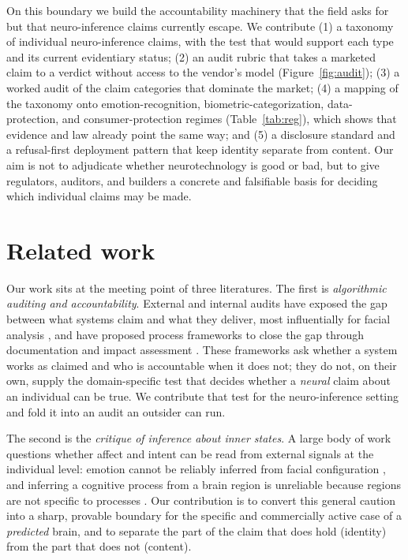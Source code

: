 \documentclass[sigconf,review,anonymous]{acmart}
\begin{document}
On this boundary we build the accountability machinery that the field asks for but that neuro-inference
claims currently escape. We contribute (1) a taxonomy of individual neuro-inference claims, with the test
that would support each type and its current evidentiary status; (2) an audit rubric that takes a marketed
claim to a verdict without access to the vendor's model (Figure~\ref{fig:audit}); (3) a worked audit of the
claim categories that dominate the market; (4) a mapping of the taxonomy onto emotion-recognition,
biometric-categorization, data-protection, and consumer-protection regimes (Table~\ref{tab:reg}), which shows
that evidence and law already point the same way; and (5) a disclosure standard and a refusal-first
deployment pattern that keep identity separate from content. Our aim is not to adjudicate whether
neurotechnology is good or bad, but to give regulators, auditors, and builders a concrete and falsifiable
basis for deciding which individual claims may be made.

\section{Related work}
Our work sits at the meeting point of three literatures. The first is \emph{algorithmic auditing and
accountability}. External and internal audits have exposed the gap between what systems claim and what they
deliver, most influentially for facial analysis \cite{buolamwini2018}, and have proposed process frameworks
to close the gap through documentation and impact assessment \cite{raji2020,metcalf2021}. These frameworks
ask whether a system works as claimed and who is accountable when it does not; they do not, on their own,
supply the domain-specific test that decides whether a \emph{neural} claim about an individual can be true.
We contribute that test for the neuro-inference setting and fold it into an audit an outsider can run.

The second is the \emph{critique of inference about inner states}. A large body of work questions whether
affect and intent can be read from external signals at the individual level: emotion cannot be reliably
inferred from facial configuration \cite{barrett2019}, and inferring a cognitive process from a brain region
is unreliable because regions are not specific to processes \cite{poldrack2006,hutzler2013}. Our
contribution is to convert this general caution into a sharp, provable boundary for the specific and
commercially active case of a \emph{predicted} brain, and to separate the part of the claim that does hold
(identity) from the part that does not (content).
\end{document}
